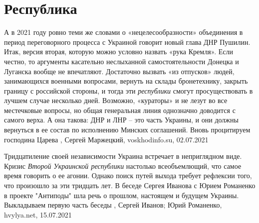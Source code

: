  
 
 
 
 
\chapter{Республика}
\label{sec:slova.respublika}

А в 2021 году ровно теми же словами о «нецелесообразности» объединения в период
переговорного процесса с Украиной говорит новый глава ДНР Пушилин. Итак, версия
вторая, которую можно условно назвать «рука Кремля». Если честно, то аргументы
касательно неслыханной самостоятельности Донецка и Луганска вообще не
впечатляют. Достаточно вызвать «из отпусков» людей, занимающихся военными
вопросами, вернуть на склады бронетехнику, закрыть границу с российской
стороны, и тогда эти \emph{республики} смогут просуществовать в лучшем случае
несколько дней. Возможно, «кураторы» и не лезут во все местечковые вопросы, но
общая генеральная линия однозначно доводится с самого верха. А она такова: ДНР
и ЛНР – это часть Украины, и они должны вернуться в ее состав по исполнению
Минских соглашений. Вновь процитируем господина Царева
, 
Сергей Маржецкий, voskhodinfo.su, 02.07.2021

Тридцатиление своей независимости Украина встречает в неприглядном виде. Кризис
\emph{Второй Украинской республики} настолько всеобъемлющий, что самое время говорить
о ее агонии. Однако поиск путей выхода требует рефлексии того, что произошло за
эти тридцать лет.  В беседе Сергея Иванова с Юрием Романенко в проекте
"Антиподы" шла речь о прошлом, настоящем и будущем Украины. Выкладываем первую
часть беседы
, 
Сергей Иванов; Юрий Романенко, hvylya.net, 15.07.2021

